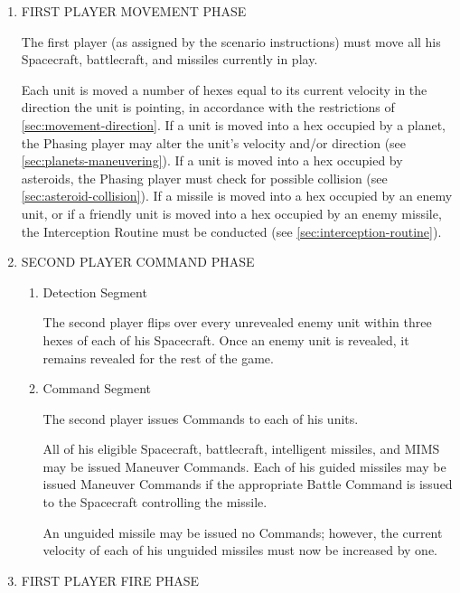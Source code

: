 \renewcommand{\theenumii}{\alph{enumii}}
\begin{enumerate}
\item FIRST PLAYER MOVEMENT PHASE\label{item:phase-1}
  
  The first player (as assigned by the scenario instructions) must
  move all his Spacecraft, battlecraft, and missiles currently in
  play.
  
  Each unit is moved a number of hexes equal to its current velocity
  in the direction the unit is pointing, in accordance with the
  restrictions of \ref{sec:movement-direction}. If a unit is moved
  into a hex occupied by a planet, the Phasing player may alter the
  unit's velocity and/or direction (see
  \ref{sec:planets-maneuvering}). If a unit is moved into a hex
  occupied by asteroids, the Phasing player must check for possible
  collision (see \ref{sec:asteroid-collision}). If a missile is moved
  into a hex occupied by an enemy unit, or if a friendly unit is moved
  into a hex occupied by an enemy missile, the Interception Routine
  must be conducted (see \ref{sec:interception-routine}).

\item SECOND PLAYER COMMAND PHASE\label{item:phase-2}

  \begin{enumerate}
  \item Detection Segment 
    
    The second player flips over every unrevealed enemy unit within
    three hexes of each of his Spacecraft. Once an enemy unit is
    revealed, it remains revealed for the rest of the game.

  \item Command Segment 
    
    The second player issues Commands to each of his units.
    
    All of his eligible Spacecraft, battlecraft, intelligent missiles,
    and MIMS may be issued Maneuver Commands. Each of his guided
    missiles may be issued Maneuver Commands if the appropriate Battle
    Command is issued to the Spacecraft controlling the missile.
    
    An unguided missile may be issued no Commands; however, the
    current velocity of each of his unguided missiles must now be
    increased by one.
  \end{enumerate}
  
\item FIRST PLAYER FIRE PHASE\label{item:phase-3}
  

\end{enumerate}
